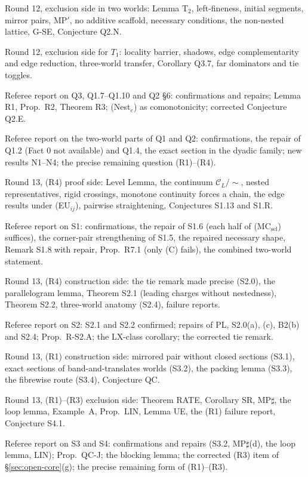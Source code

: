 \documentclass[11pt]{article}
\theoremstyle{definition}
\theoremstyle{remark}
\newcommand{\C}{\mathcal C}
\begin{document}
\begin{description}[leftmargin=*,font=\normalfont\ttfamily,style=nextline]
\item[Q2\_notes.md] Round 12, exclusion side in two worlds: Lemma T$_2$, left-fineness, initial segments, mirror pairs, MP$'$, no additive scaffold, necessary conditions, the non-nested lattice, G-SE, Conjecture Q2.N.
\item[Q3\_notes.md] Round 12, exclusion side for $T_1$: locality barrier, shadows, edge complementarity and edge reduction, three-world transfer, Corollary Q3.7, far dominators and tie toggles.
\item[Q3\_referee.md] Referee report on Q3, Q1.7--Q1.10 and Q2 \S6: confirmations and repairs; Lemma R1, Prop.~R2, Theorem R3; (Nest$_e$) as comonotonicity; corrected Conjecture Q2.E.
\item[Q12\_referee.md] Referee report on the two-world parts of Q1 and Q2: confirmations, the repair of Q1.2 (Fact 0 not available) and Q1.4, the exact section in the dyadic family; new results N1--N4; the precise remaining question (R1)--(R4).
\item[S1\_notes.md] Round 13, (R4) proof side: Level Lemma, the continuum $\C_L/{\sim}$, nested representatives, rigid crossings, monotone continuity forces a chain, the edge results under (EU$_{ij}$), pairwise straightening, Conjectures S1.13 and S1.R.
\item[S1\_referee.md] Referee report on S1: confirmations, the repair of S1.6 (each half of (MC$_{\mathrm{sel}}$) suffices), the corner-pair strengthening of S1.5, the repaired necessary shape, Remark S1.8 with repair, Prop.~R7.1 (only (C) fails), the combined two-world statement.
\item[S2\_notes.md] Round 13, (R4) construction side: the tie remark made precise (S2.0), the parallelogram lemma, Theorem S2.1 (leading charges without nestedness), Theorem S2.2, three-world anatomy (S2.4), failure reports.
\item[S2\_referee.md] Referee report on S2: S2.1 and S2.2 confirmed; repairs of PL, S2.0(a), (c), B2(b) and S2.4; Prop.~R-S2.A; the LX-class corollary; the corrected tie remark.
\item[S3\_notes.md] Round 13, (R1) construction side: mirrored pair without closed sections (S3.1), exact sections of band-and-translates worlds (S3.2), the packing lemma (S3.3), the fibrewise route (S3.4), Conjecture QC.
\item[S4\_notes.md] Round 13, (R1)--(R3) exclusion side: Theorem RATE, Corollary SR, MP$\sharp$, the loop lemma, Example~A, Prop.~LIN, Lemma UE, the (R1) failure report, Conjecture S4.1.
\item[S34\_referee.md] Referee report on S3 and S4: confirmations and repairs (S3.2, MP$\sharp$(d), the loop lemma, LIN); Prop.~QC-J; the blocking lemma; the corrected (R3) item of \S\ref{sec:open-core}(g); the precise remaining form of (R1)--(R3).

\end{description}
\end{document}
